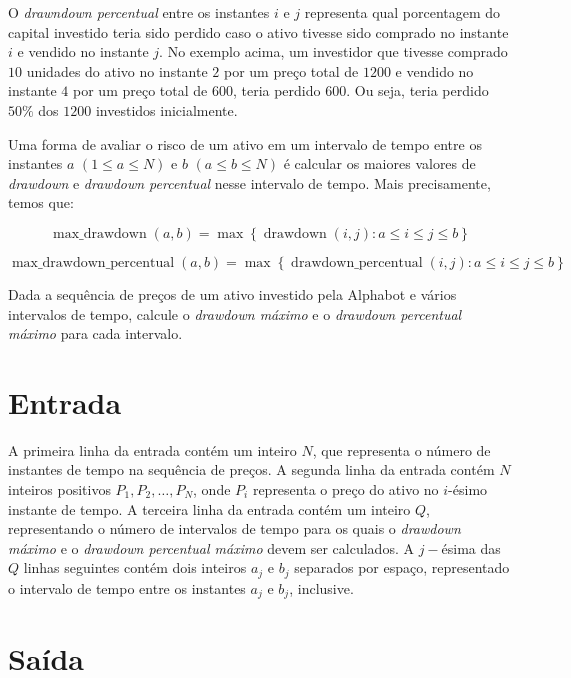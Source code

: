 O \emph{drawndown percentual} entre os instantes $i$ e $j$ representa qual porcentagem do capital investido teria sido perdido caso o ativo tivesse
sido comprado no instante $i$ e vendido no instante $j$. No exemplo acima, um investidor que tivesse comprado $10$ unidades do ativo no instante $2$
por um preço total de $1200$ e vendido no instante $4$ por um preço total de $600$, teria perdido $600$. Ou seja, teria perdido $50\%$ dos $1200$
investidos inicialmente.


Uma forma de avaliar o risco de um ativo em um intervalo de tempo entre os instantes $a$ $(1 \leq a \leq N)$ e $b$ $(a \leq b \leq N)$ é calcular
os maiores valores de \emph{drawdown} e \emph{drawdown percentual} nesse intervalo de tempo. Mais precisamente, temos que:

\begin{equation*}
    \operatorname{max\_drawdown}\left(a, b\right) = \max\left\{\operatorname{drawdown}\left(i, j\right) : {a \leq i \leq j \leq b}\right\}
\end{equation*}

\begin{equation*}
    \operatorname{max\_drawdown\_percentual}\left(a, b\right) = \max\left\{\operatorname{drawdown\_percentual}\left(i, j\right) : {a \leq i \leq j \leq b}\right\}
\end{equation*}

Dada a sequência de preços de um ativo investido pela Alphabot e vários intervalos de tempo, calcule o \emph{drawdown máximo} e o
\emph{drawdown percentual máximo} para cada intervalo.

\section*{Entrada}

A primeira linha da entrada contém um inteiro $N$, que representa o número de instantes de tempo na sequência de preços.
A segunda linha da entrada contém $N$ inteiros positivos $P_1, P_2, \ldots, P_N$, onde $P_i$ representa o preço do ativo no $i$-ésimo instante de tempo.
A terceira linha da entrada contém um inteiro $Q$, representando o número de intervalos de tempo para os quais o \emph{drawdown máximo} e o
\emph{drawdown percentual máximo}  devem ser calculados.
A $j-$ésima das $Q$ linhas seguintes contém dois inteiros $a_j$ e $b_j$ separados por espaço, representado o intervalo de tempo entre os instantes
$a_j$ e $b_j$, inclusive. 
\section*{Saída}

